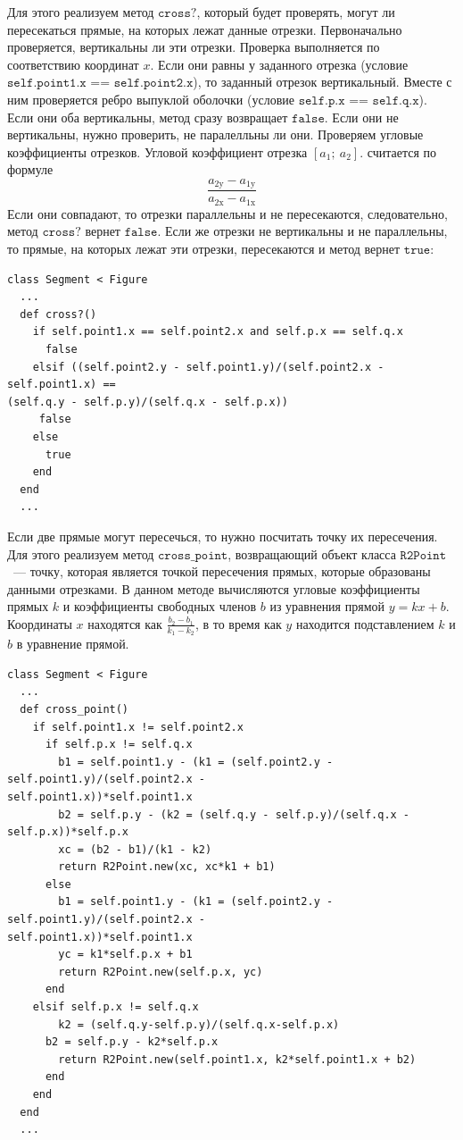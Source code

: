 Для этого реализуем метод $\texttt{cross?}$, который будет проверять, могут ли пересекаться прямые, на которых лежат данные отрезки. Первоначально проверяется, вертикальны ли эти отрезки. Проверка выполняется по соответствию координат $\mathit x$. Если они равны у заданного отрезка (условие $\texttt{self.point1.x == self.point2.x}$), то заданный отрезок вертикальный. Вместе с ним проверяется ребро выпуклой оболочки (условие $\texttt{self.p.x == self.q.x}$). Если они оба вертикальны, метод сразу возвращает $\texttt{false}$. Если они не вертикальны, нужно проверить, не паралелльны ли они. Проверяем угловые коэффициенты  отрезков. Угловой коэффициент отрезка $\left [ a_{1};~a_{2} \right ]$. считается по формуле $$\frac{a_{2\mathrm y}-a_{1\mathrm y}}{a_{2\mathrm x}-a_{1\mathrm x}}$$
Если они совпадают, то отрезки параллельны и не пересекаются, следовательно, метод $\texttt{cross?}$ вернет $\texttt{false}$. Если же отрезки не вертикальны и не параллельны, то прямые, на которых лежат эти отрезки, пересекаются и метод вернет $\texttt{true}$:
\begin{small}
\begin{verbatim}
class Segment < Figure
  ...
  def cross?()
    if self.point1.x == self.point2.x and self.p.x == self.q.x
      false 
    elsif ((self.point2.y - self.point1.y)/(self.point2.x - self.point1.x) ==
(self.q.y - self.p.y)/(self.q.x - self.p.x))
     false
    else
      true
    end
  end
  ...
\end{verbatim}
\end{small}   

Если две прямые могут пересечься, то нужно посчитать точку их пересечения. Для этого реализуем метод $\texttt{cross\_point}$, возвращающий объект класса $\texttt{R2Point}$ ~--- точку, которая является точкой пересечения прямых, которые образованы данными отрезками. В данном методе вычисляются угловые коэффициенты прямых $\mathit k$ и коэффициенты свободных членов $\mathit b$ из уравнения прямой $\mathit{y=kx+b}$. Координаты $\mathit x$ находятся как $\mathit{\frac{b_{2}-b_{1}}{k_{1}-k_{2}}}$, в то время как $\mathit y$ находится подставлением $\mathit k$ и $\mathit b$ в уравнение прямой.
\newpage
\begin{small}
\begin{verbatim}
class Segment < Figure
  ...
  def cross_point()
    if self.point1.x != self.point2.x 
      if self.p.x != self.q.x
        b1 = self.point1.y - (k1 = (self.point2.y - self.point1.y)/(self.point2.x -
self.point1.x))*self.point1.x 
        b2 = self.p.y - (k2 = (self.q.y - self.p.y)/(self.q.x - self.p.x))*self.p.x
        xc = (b2 - b1)/(k1 - k2)
        return R2Point.new(xc, xc*k1 + b1)
      else
        b1 = self.point1.y - (k1 = (self.point2.y - self.point1.y)/(self.point2.x -
self.point1.x))*self.point1.x
        yc = k1*self.p.x + b1
        return R2Point.new(self.p.x, yc)
      end		
    elsif self.p.x != self.q.x  
        k2 = (self.q.y-self.p.y)/(self.q.x-self.p.x)
	  b2 = self.p.y - k2*self.p.x
        return R2Point.new(self.point1.x, k2*self.point1.x + b2)
      end	
    end
  end
  ...
\end{verbatim}
\end{small}   

